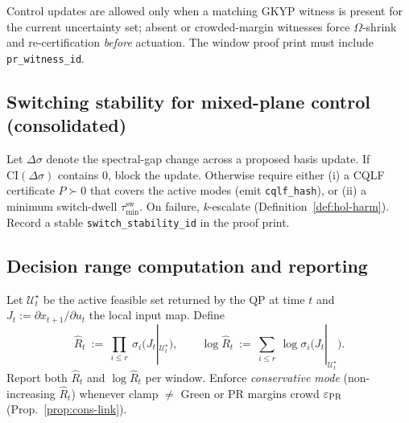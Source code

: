 \begin{proposition}\label{prop:pr-consume}
Control updates are allowed only when a matching GKYP witness is present for the current uncertainty set; absent or crowded-margin witnesses force $\Omega$-shrink and re-certification \emph{before} actuation. The window proof print must include \texttt{pr\_witness\_id}.
\end{proposition}

\subsection{Switching stability for mixed-plane control (consolidated)}\label{subsec:switch}
\emph{}

\begin{lemma}\label{lem:deg-stab}
Let $\Delta\sigma$ denote the spectral-gap change across a proposed basis update. If $\mathrm{CI}(\Delta\sigma)$ contains $0$, block the update. Otherwise require either (i) a CQLF certificate $P\succ 0$ that covers the active modes (emit \texttt{cqlf\_hash}), or (ii) a minimum switch-dwell $\tau_{\min}^{\mathrm{sw}}$. On failure, \emph{k}-escalate (Definition~\ref{def:hol-harm}). Record a stable \texttt{switch\_stability\_id} in the proof print.
\end{lemma}

\subsection{Decision range computation and reporting}\label{subsec:range}
\emph{}

\begin{definition}\label{def:range}
Let $\mathcal U^\star_t$ be the active feasible set returned by the QP at time $t$ and $J_t:=\partial x_{t+1}/\partial u_t$ the local input map. Define
\[
\hat R_t\ :=\ \prod_{i\le r}\ \sigma_i\big(J_t|_{\mathcal U^\star_t}\big),\qquad
\log \hat R_t\ :=\ \sum_{i\le r}\ \log \sigma_i\big(J_t|_{\mathcal U^\star_t}\big).
\]
Report both $\hat R_t$ and $\log \hat R_t$ per window. Enforce \emph{conservative mode} (non-increasing $\hat R_t$) whenever clamp $\neq$ Green or PR margins crowd $\varepsilon_{\mathrm{PR}}$ (Prop.~\ref{prop:cons-link}).
\end{definition}

